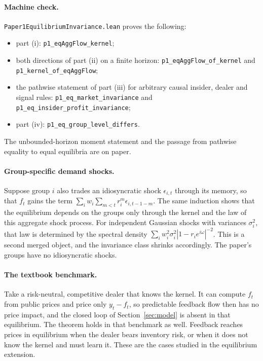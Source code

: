 \documentclass[12pt]{article}
\theoremstyle{definition}
\theoremstyle{remark}
\begin{document}
\paragraph{Machine check.} \nolinkurl{Paper1EquilibriumInvariance.lean} proves the following:
\begin{itemize}[itemsep=1pt,topsep=2pt]
\item part (i): \texttt{p1\_eqAggFlow\_kernel};
\item both directions of part (ii) on a finite horizon: \texttt{p1\_eqAggFlow\_of\_kernel} and \texttt{p1\_kernel\_of\_eqAggFlow};
\item the pathwise statement of part (iii) for arbitrary causal insider, dealer and signal rules: \texttt{p1\_eq\_market\_invariance} and \texttt{p1\_eq\_insider\_profit\_invariance};
\item part (iv): \texttt{p1\_eq\_group\_level\_differs}.
\end{itemize}
The unbounded-horizon moment statement and the passage from pathwise equality to equal equilibria are on paper.

\paragraph{Group-specific demand shocks.} Suppose group $i$ also trades an idiosyncratic shock $\epsilon_{i,t}$ through its memory, so that $f_t$ gains the term $\sum_iw_i\sum_{m<t}r_i^m\epsilon_{i,t-1-m}$. The same induction shows that the equilibrium depends on the groups only through the kernel and the law of this aggregate shock process. For independent Gaussian shocks with variances $\sigma_i^2$, that law is determined by the spectral density $\sum_iw_i^2\sigma_i^2|1-r_ie^{i\omega}|^{-2}$. This is a second merged object, and the invariance class shrinks accordingly. The paper's groups have no idiosyncratic shocks.

\paragraph{The textbook benchmark.} Take a risk-neutral, competitive dealer that knows the kernel. It can compute $f_t$ from public prices and price only $y_t-f_t$, so predictable feedback flow then has no price impact, and the closed loop of Section~\ref{sec:model} is absent in that equilibrium. The theorem holds in that benchmark as well. Feedback reaches prices in equilibrium when the dealer bears inventory risk, or when it does not know the kernel and must learn it. These are the cases studied in the equilibrium extension.
\end{document}
